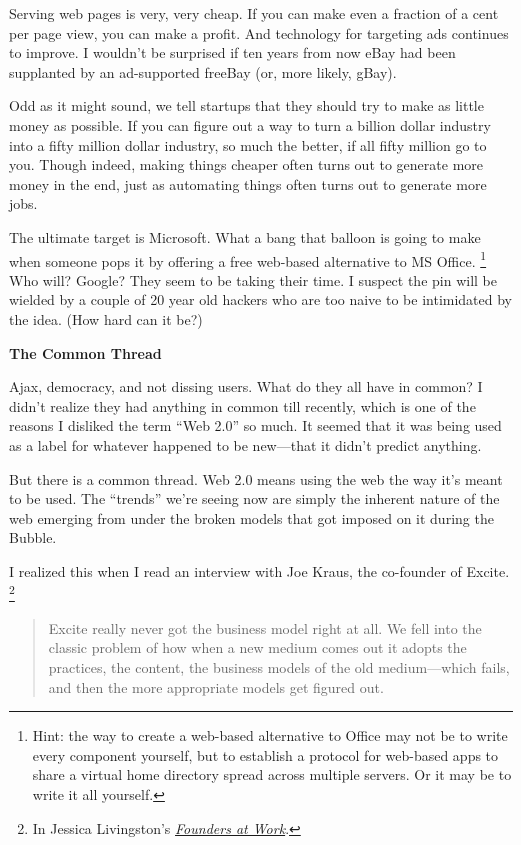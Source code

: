 \documentclass[12pt]{book}
\begin{document}
Serving web pages is very, very cheap. If you can make even a fraction
of a cent per page view, you can make a profit. And technology for
targeting ads continues to improve. I wouldn't be surprised if ten years
from now eBay had been supplanted by an ad-supported freeBay (or, more
likely, gBay).

Odd as it might sound, we tell startups that they should try to make as
little money as possible. If you can figure out a way to turn a billion
dollar industry into a fifty million dollar industry, so much the
better, if all fifty million go to you. Though indeed, making things
cheaper often turns out to generate more money in the end, just as
automating things often turns out to generate more jobs.

The ultimate target is Microsoft. What a bang that balloon is going to
make when someone pops it by offering a free web-based alternative to MS
Office. \footnote{Hint: the way to create a web-based alternative to Office may
not be to write every component yourself, but to establish a protocol
for web-based apps to share a virtual home directory spread across
multiple servers. Or it may be to write it all yourself.} Who will? Google? They seem to be taking
their time. I suspect the pin will be wielded by a couple of 20 year old
hackers who are too naive to be intimidated by the idea. (How hard can
it be?)

\textbf{The Common Thread}

Ajax, democracy, and not dissing users. What do they all have in common?
I didn't realize they had anything in common till recently, which is one
of the reasons I disliked the term ``Web 2.0'' so much. It seemed that
it was being used as a label for whatever happened to be new---that it
didn't predict anything.

But there is a common thread. Web 2.0 means using the web the way it's
meant to be used. The ``trends'' we're seeing now are simply the
inherent nature of the web emerging from under the broken models that
got imposed on it during the Bubble.

I realized this when I read an interview with Joe Kraus, the co-founder
of Excite. \footnote{In Jessica Livingston's
\href{http://foundersatwork.com}{\emph{Founders at Work}}.}

\begin{quote}
Excite really never got the business model right at all. We fell into
the classic problem of how when a new medium comes out it adopts the
practices, the content, the business models of the old medium---which
fails, and then the more appropriate models get figured out.
\end{quote}
\end{document}

